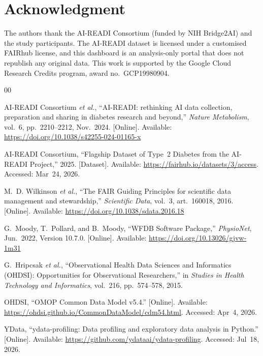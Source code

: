 \documentclass[conference]{IEEEtran}
\begin{document}
\section*{Acknowledgment}
The authors thank the AI-READI Consortium (funded by NIH Bridge2AI) and the study participants. The AI-READI dataset is licensed under a customised FAIRhub license, and this dashboard is an analysis-only portal that does not republish any original data. This work is supported by the Google Cloud Research Credits program, award no.\ GCP19980904.

\begin{thebibliography}{00}

{AI-READI Consortium} \emph{et al.}, ``{AI}-{READI}: rethinking {AI} data collection, preparation and sharing in diabetes research and beyond,'' \emph{Nature Metabolism}, vol.~6, pp.~2210--2212, Nov.\ 2024. [Online]. Available: \url{https://doi.org/10.1038/s42255-024-01165-x}

{AI-READI Consortium}, ``Flagship Dataset of Type~2 Diabetes from the AI-READI Project,'' 2025. [Dataset]. Available: \url{https://fairhub.io/datasets/3/access}. Accessed: Mar~24, 2026.

M.~D. Wilkinson \emph{et al.}, ``The FAIR Guiding Principles for scientific data management and stewardship,'' \emph{Scientific Data}, vol.~3, art.~160018, 2016. [Online]. Available: \url{https://doi.org/10.1038/sdata.2016.18}

G.~Moody, T.~Pollard, and B.~Moody, ``{WFDB} Software Package,'' \emph{PhysioNet}, Jun.\ 2022, Version 10.7.0. [Online]. Available: \url{https://doi.org/10.13026/gjvw-1m31}

G.~Hripcsak \emph{et al.}, ``Observational Health Data Sciences and Informatics (OHDSI): Opportunities for Observational Researchers,'' in \emph{Studies in Health Technology and Informatics}, vol.~216, pp.~574--578, 2015.

OHDSI, ``OMOP Common Data Model v5.4.'' [Online]. Available: \url{https://ohdsi.github.io/CommonDataModel/cdm54.html}. Accessed: Apr~4, 2026.

{YData}, ``ydata-profiling: Data profiling and exploratory data analysis in Python.'' [Online]. Available: \url{https://github.com/ydataai/ydata-profiling}. Accessed: Jul~18, 2026.


\end{thebibliography}
\end{document}
